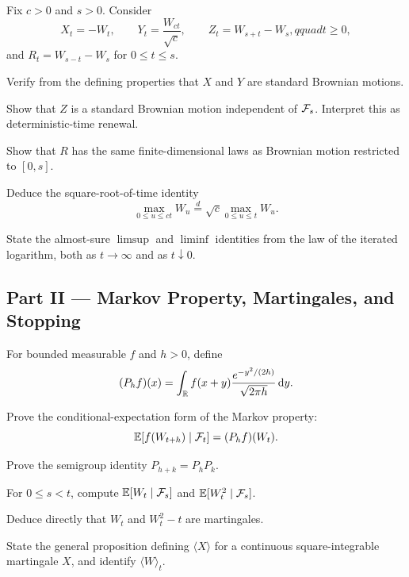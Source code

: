 \begin{exercise}
Fix \(c>0\) and \(s>0\). Consider
\[
X_t=-W_t,
\qquad
Y_t=\frac{W_{ct}}{\sqrt c},
\qquad
Z_t=W_{s+t}-W_s,qquad t\geq0,
\]
and \(R_t=W_{s-t}-W_s\) for \(0\leq t\leq s\).
\begin{exparts}
  \item Verify from the defining properties that \(X\) and \(Y\) are
  standard Brownian motions.
  \item Show that \(Z\) is a standard Brownian motion independent of
  \(\mathcal{F}_s\). Interpret this as deterministic-time renewal.
  \item Show that \(R\) has the same finite-dimensional laws as Brownian
  motion restricted to \([0,s]\).
  \item Deduce the square-root-of-time identity
  \[
  \max_{0\leq u\leq ct}W_u
  \overset{d}=\sqrt c\max_{0\leq u\leq t}W_u.
  \]
  \item State the almost-sure \(\limsup\) and \(\liminf\) identities from
  the law of the iterated logarithm, both as \(t\to\infty\) and as
  \(t\downarrow0\).
\end{exparts}
\end{exercise}

\subsection*{Part II --- Markov Property, Martingales, and Stopping}

\begin{exercise}
For bounded measurable \(f\) and \(h>0\), define
\[
(P_hf)(x)=\int_{\mathbb{R}}f(x+y)
\frac{e^{-y^2/(2h)}}{\sqrt{2\pi h}}\,\mathrm{d} y.
\]
\begin{exparts}
  \item Prove the conditional-expectation form of the Markov property:
  \[
  \mathbb{E}[f(W_{t+h})\mid\mathcal{F}_t]=(P_hf)(W_t).
  \]
  \item Prove the semigroup identity \(P_{h+k}=P_hP_k\).
  \item For \(0\leq s<t\), compute
  \(\mathbb{E}[W_t\mid\mathcal{F}_s]\) and \(\mathbb{E}[W_t^2\mid\mathcal{F}_s]\).
  \item Deduce directly that \(W_t\) and \(W_t^2-t\) are martingales.
  \item State the general proposition defining \(\langle X\rangle\) for a
  continuous square-integrable martingale \(X\), and identify
  \(\langle W\rangle_t\).
\end{exparts}
\end{exercise}

